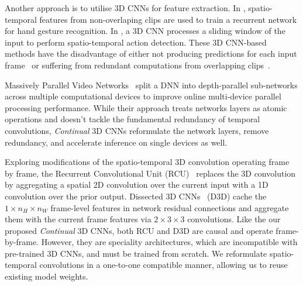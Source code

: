 Another approach is to utilise 3D CNNs for feature extraction. 
In \cite{molchanov2016online}, spatio-temporal features from non-overlaping clips are used to train a recurrent network for hand gesture recognition.
In \cite{kopuklu2019yowo}, a 3D CNN processes a sliding window of the input to perform spatio-temporal action detection.
These 3D CNN-based methods have the disadvantage of either not producing predictions for each input frame~\cite{molchanov2016online} or suffering from redundant computations from overlapping clips~\cite{kopuklu2019yowo}.

Massively Parallel Video Networks~\cite{carreira2018massively} split a DNN into depth-parallel sub-networks across multiple computational devices to improve online multi-device parallel processing performance. While their approach treats networks layers as atomic operations and doesn't tackle the fundamental redundancy of temporal convolutions, \textit{Continual} 3D CNNs reformulate the network layers, remove redundancy, and accelerate inference on single devices as well.

Exploring modifications of the spatio-temporal 3D convolution operating frame by frame, the Recurrent Convolutional Unit (RCU)~\cite{singh2019recurrent} replaces the 3D convolution by aggregating a spatial 2D convolution over the current input with a 1D convolution over the prior output. 
Dissected 3D CNNs~\cite{kopuklu2020dissected} (D3D) cache the $1 \times n_H \times n_W$ frame-level features in network residual connections and aggregate them with the current frame features via $2 \times 3 \times 3$ convolutions.
Like the our proposed \textit{Continual} 3D CNNs, both RCU and D3D are causal and operate frame-by-frame.
However, they are speciality architectures, which are incompatible with pre-trained 3D CNNs, and must be trained from scratch.
We reformulate spatio-temporal convolutions in a one-to-one compatible manner, allowing us to reuse existing model weights. 

